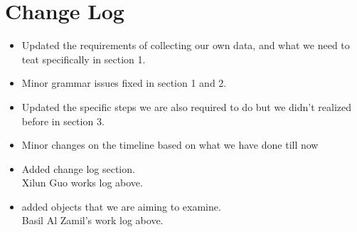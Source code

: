 \documentclass[10pt,draftclsnofoot,onecolumn,journal,compsoc]{IEEEtran}
\begin{document}
\section{Change Log}
\begin{itemize}
    \item Updated the requirements of collecting our own data, and what we need to teat specifically in section 1.
    \item Minor grammar issues fixed in section 1 and 2.
    \item Updated the specific steps we are also required to do but we didn't realized before in section 3.
    \item Minor changes on the timeline based on what we have done till now
    \item Added change log section.\\

Xilun Guo works log above.\\
\end{itemize}

\begin{itemize}
    \item added objects that we are aiming to examine.\\

Basil Al Zamil's work log above.\\


\end{itemize}
\end{document}
